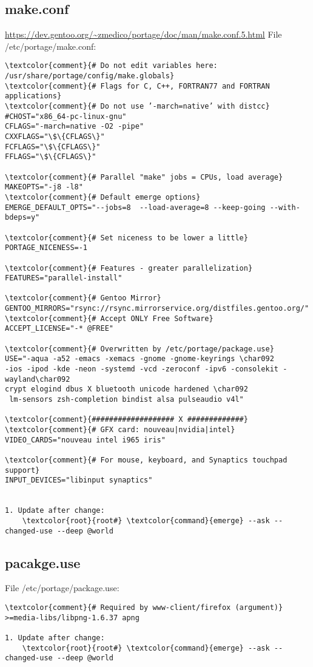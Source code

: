 \documentclass[10pt, a4paper, onecolumn, openany]{book}         %
\begin{document}
\subsection{make.conf}
\label{make.conf}
\underline{\url{https://dev.gentoo.org/~zmedico/portage/doc/man/make.conf.5.html}}\newline
File \textcolor{file}{/etc/portage/make.conf}:
\begin{Verbatim}[commandchars=\\\{\}]
\textcolor{comment}{# Do not edit variables here: /usr/share/portage/config/make.globals}
\textcolor{comment}{# Flags for C, C++, FORTRAN77 and FORTRAN applications}
\textcolor{comment}{# Do not use ’-march=native’ with distcc}
#CHOST="x86_64-pc-linux-gnu"
CFLAGS="-march=native -O2 -pipe"
CXXFLAGS="\$\{CFLAGS\}"
FCFLAGS="\$\{CFLAGS\}"
FFLAGS="\$\{CFLAGS\}"

\textcolor{comment}{# Parallel "make" jobs = CPUs, load average}
MAKEOPTS="-j8 -l8" 
\textcolor{comment}{# Default emerge options}
EMERGE_DEFAULT_OPTS="--jobs=8  --load-average=8 --keep-going --with-bdeps=y"

\textcolor{comment}{# Set niceness to be lower a little}
PORTAGE_NICENESS=-1

\textcolor{comment}{# Features - greater parallelization}
FEATURES="parallel-install"

\textcolor{comment}{# Gentoo Mirror}
GENTOO_MIRRORS="rsync://rsync.mirrorservice.org/distfiles.gentoo.org/"
\textcolor{comment}{# Accept ONLY Free Software}
ACCEPT_LICENSE="-* @FREE"

\textcolor{comment}{# Overwritten by /etc/portage/package.use}
USE="-aqua -a52 -emacs -xemacs -gnome -gnome-keyrings \char092
-ios -ipod -kde -neon -systemd -vcd -zeroconf -ipv6 -consolekit -wayland\char092
crypt elogind dbus X bluetooth unicode hardened \char092
 lm-sensors zsh-completion bindist alsa pulseaudio v4l"

\textcolor{comment}{################### X #############}
\textcolor{comment}{# GFX card: nouveau|nvidia|intel}
VIDEO_CARDS="nouveau intel i965 iris"

\textcolor{comment}{# For mouse, keyboard, and Synaptics touchpad support}
INPUT_DEVICES="libinput synaptics"


1. Update after change:
    \textcolor{root}{root#} \textcolor{command}{emerge} --ask --changed-use --deep @world
\end{Verbatim}


\subsection{pacakge.use}
\label{package.use}
File \textcolor{file}{/etc/portage/package.use}:
\begin{Verbatim}[commandchars=\\\{\}]
\textcolor{comment}{# Required by www-client/firefox (argument)}
>=media-libs/libpng-1.6.37 apng

1. Update after change:
    \textcolor{root}{root#} \textcolor{command}{emerge} --ask --changed-use --deep @world
\end{Verbatim}
\end{document}
